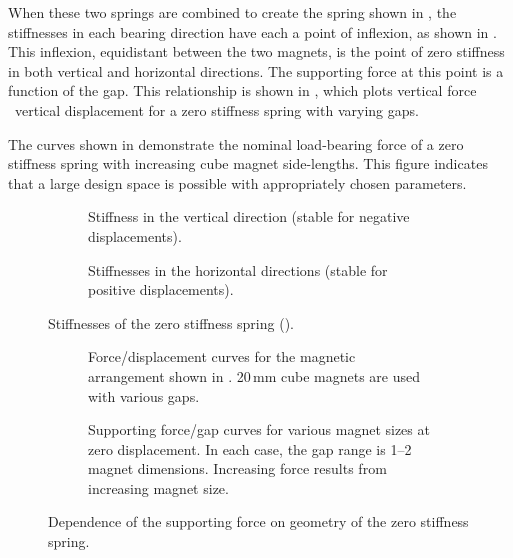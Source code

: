 When these two springs are combined to create the spring shown in
, the stiffnesses in each bearing direction
have each a point of inflexion, as shown in . This
inflexion, equidistant between the two magnets, is the point of zero
stiffness in both vertical and horizontal directions. The supporting
force at this point is a function of the gap. This relationship is
shown in , which plots vertical force
\vs\  vertical displacement for a zero stiffness spring with varying
gaps.

The curves shown in  demonstrate the
nominal load-bearing force of a zero stiffness spring with
increasing cube magnet side-lengths. This figure indicates that a
large design space is possible with appropriately chosen parameters.

\begin{figure}[p]
  \begin{subfigure}
    \caption{Stiffness in the vertical direction
     (stable for negative displacements).}
   \end{subfigure}
  \hfill
  \begin{subfigure}
    \caption{Stiffnesses in the horizontal directions
     (stable for positive displacements).}
  \end{subfigure}
  \caption{Stiffnesses of the zero stiffness spring ().}
\end{figure}

\begin{figure}
  \begin{subfigure}
    \caption{Force/displacement curves for the magnetic arrangement shown
        in . 20\,mm cube magnets
        are used with various gaps.
        }
  \end{subfigure}
  \par
  \begin{subfigure}
    \caption{Supporting force/gap curves for various magnet sizes
     at zero displacement. In each case, the gap range is 1--2 magnet dimensions.
     Increasing force results from increasing magnet size.
     }
  \end{subfigure}
     \caption{Dependence of the supporting force on geometry of the
       zero stiffness spring.}
\end{figure}

